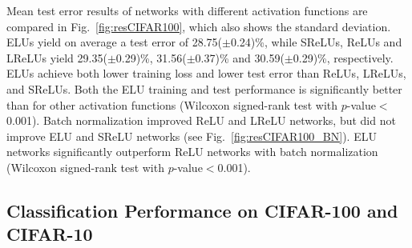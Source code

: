 \documentclass{article}
\begin{document}
Mean test error results of networks with different activation functions
are compared in Fig.~\ref{fig:resCIFAR100}, which also shows the standard
deviation.
ELUs yield on average a test error of 28.75($\pm$0.24)\%,
while SReLUs, ReLUs and LReLUs yield 29.35($\pm$0.29)\%,
31.56($\pm$0.37)\% and 30.59($\pm$0.29)\%, respectively.
ELUs achieve both lower training loss and lower test error than ReLUs,
LReLUs, and SReLUs.
Both the ELU training and test performance is significantly better than for other
activation functions (Wilcoxon signed-rank test with $p$-value$<$0.001).
Batch normalization improved ReLU and LReLU networks, but did not improve ELU and SReLU networks (see Fig.~\ref{fig:resCIFAR100_BN}).
ELU networks significantly outperform ReLU networks with batch
normalization (Wilcoxon signed-rank test with $p$-value$<$0.001).


\subsection{Classification Performance on CIFAR-100 and CIFAR-10}
\label{sec:CIFAR100_10}
\end{document}
